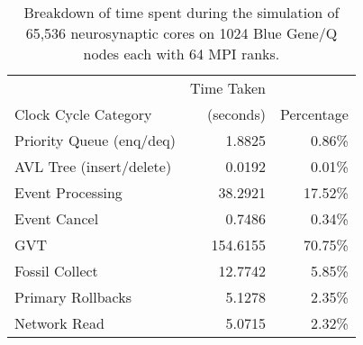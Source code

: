 \begin{table}[t!]
\centering
\caption{Breakdown of time spent during the simulation of 65,536 neurosynaptic
cores on 1024 Blue Gene/Q nodes each with 64 MPI ranks.}
\label{table:time}
\qquad
\begin{tabular}{|l|r|r|}
\hline
                     & Time Taken & \\
Clock Cycle Category & (seconds)  	& Percentage \\ \hline
Priority Queue (enq/deq) 			& 1.8825 & 	    0.86\% \\ \hline
AVL Tree (insert/delete) 			& 0.0192  &  	0.01\% \\ \hline
Event Processing         			& 38.2921 & 	17.52\% \\ \hline
Event Cancel             			& 0.7486  &  	0.34\% \\ \hline
GVT                      			&  154.6155  &  70.75\% \\ \hline
Fossil Collect           			&   12.7742  &  5.85\% \\ \hline
Primary Rollbacks        			&    5.1278  &  2.35\% \\ \hline
Network Read             			&    5.0715  &  2.32\% \\ \hline
\end{tabular}
\end{table}
